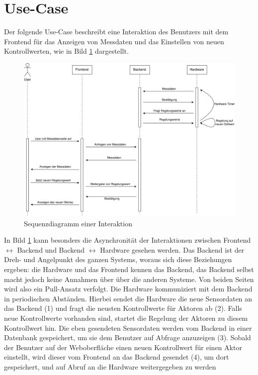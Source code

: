 \section{Use-Case}
Der folgende Use-Case beschreibt eine Interaktion des Benutzers mit dem Frontend für das Anzeigen von Messdaten und das Einstellen von neuen Kontrollwerten, wie in Bild \ref{img:sequence} dargestellt.

\begin{figure}[h]
\includegraphics[width=\textwidth]{images/sequence_diagram.png}
\caption{Sequenzdiagramm einer Interaktion}
\label{img:sequence}
\end{figure}

In Bild \ref{img:sequence} kann besonders die Asynchronität der Interaktionen zwischen Frontend $\leftrightarrow$ Backend und Backend $\leftrightarrow$ Hardware gesehen werden.
Das Backend ist der Dreh- und Angelpunkt des ganzen Systems, woraus sich diese Beziehungen ergeben: die Hardware und das Frontend kennen das Backend, das Backend selbst macht jedoch keine Annahmen über über die anderen Systeme.
Von beiden Seiten wird also ein Pull-Ansatz verfolgt. \newline
Die Hardware kommuniziert mit dem Backend in periodischen Abständen.
Hierbei sendet die Hardware die neue Sensordaten an das Backend (1) und fragt die neusten Kontrollwerte für Aktoren ab (2).
Falls neue Kontrollwerte vorhanden sind, startet die Regelung der Aktoren zu diesem Kontrollwert hin.\newline
Die eben gesendeten Sensordaten werden vom Backend in einer Datenbank gespeichert, um sie dem Benutzer auf Abfrage anzuzeigen (3).
Sobald der Benutzer auf der Weboberfläche einen neuen Kontrollwert für einen Aktor einstellt, wird dieser vom Frontend an das Backend gesendet (4), um dort gespeichert, und auf Abruf an die Hardware weitergegeben zu werden

\pagebreak
